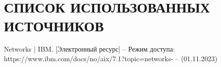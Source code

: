\section*{СПИСОК ИСПОЛЬЗОВАННЫХ ИСТОЧНИКОВ}

\begingroup
\renewcommand{\section}[2]{}
\begin{thebibliography}{}
	Networks | IBM. [Электронный ресурс] – Режим доступа: https://www.ibm.com/docs/no/aix/7.1?topic=networks- – (01.11.2023)
\end{thebibliography}
\endgroup

\pagebreak